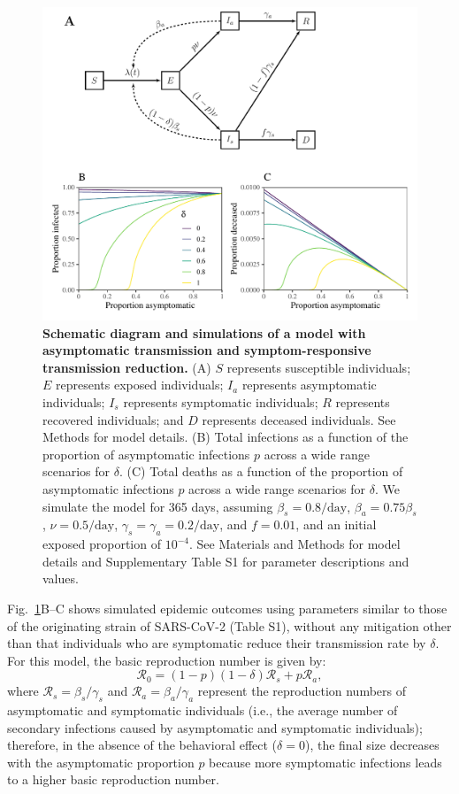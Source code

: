 \documentclass[12pt]{article}
\newcommand{\fref}[1]{Fig.~\ref{fig:#1}}
\newcommand{\RR}{\ensuremath{{\mathcal R}}\xspace}
\begin{document}
\begin{figure}[!ht]
\includegraphics[width=\textwidth]{diagram_base.pdf}
\caption{
\textbf{Schematic diagram and simulations of a model with asymptomatic transmission and symptom-responsive transmission reduction.}
(A) $S$ represents susceptible individuals; $E$ represents exposed individuals; $I_a$ represents asymptomatic individuals; $I_s$ represents symptomatic individuals; $R$ represents recovered individuals; and $D$ represents deceased individuals. See Methods for model details.
(B) Total infections as a function of the proportion of asymptomatic infections $p$ across a wide range scenarios for $\delta$.
(C) Total deaths as a function of the proportion of asymptomatic infections $p$ across a wide range scenarios for $\delta$.
We simulate the model for 365 days, assuming $\beta_s = 0.8/\mathrm{day}$, $\beta_a = 0.75 \beta_s$, $\nu=0.5/\mathrm{day}$, $\gamma_s=\gamma_a=0.2/\mathrm{day}$, and $f=0.01$, and an initial exposed proportion of $10^{-4}$.
See Materials and Methods for model details and Supplementary Table S1 for parameter descriptions and values.
}
\label{fig:base}
\end{figure}

\fref{base}B--C shows simulated epidemic outcomes using parameters similar to those of the originating strain of SARS-CoV-2 (Table S1), without any mitigation other than that individuals who are symptomatic reduce their transmission rate by $\delta$. 
For this model, the basic reproduction number is given by:
\begin{equation}
\RR_0 = (1-p) (1-\delta) \RR_s + p \RR_a,
\end{equation}
where $\RR_s = \beta_s/\gamma_s$ and $\RR_a = \beta_a/\gamma_a$ represent the reproduction numbers of asymptomatic and symptomatic individuals (i.e., the average number of secondary infections caused by asymptomatic and symptomatic individuals);
therefore, in the absence of the behavioral effect ($\delta=0$), the final size decreases with the asymptomatic proportion $p$ because more symptomatic infections leads to a higher basic reproduction number.
\end{document}

